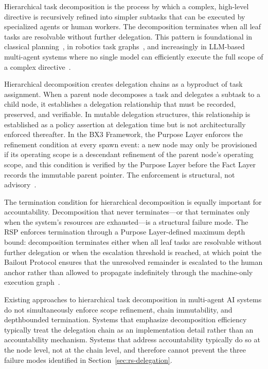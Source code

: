 Hierarchical task decomposition is the process by which a complex, high-level directive is recursively refined into simpler subtasks that can be executed by specialized agents or human workers. The decomposition terminates when all leaf tasks are resolvable without further delegation. This pattern is foundational in classical planning~\cite{hybrid_llm_agents}, in robotics task graphs~\cite{robot_task_decomposition}, and increasingly in LLM-based multi-agent systems where no single model can efficiently execute the full scope of a complex directive~\cite{multi_agent_decomposition_survey}.

Hierarchical decomposition creates delegation chains as a byproduct of task assignment. When a parent node decomposes a task and delegates a subtask to a child node, it establishes a delegation relationship that must be recorded, preserved, and verifiable. In mutable delegation structures, this relationship is established as a policy assertion at delegation time but is not architecturally enforced thereafter. In the BX3 Framework, the Purpose Layer enforces the refinement condition at every spawn event: a new node may only be provisioned if its operating scope is a descendant refinement of the parent node's operating scope, and this condition is verified by the Purpose Layer before the Fact Layer records the immutable parent pointer. The enforcement is structural, not advisory~\cite{bx3_framework_2026}.

The termination condition for hierarchical decomposition is equally important for accountability. Decomposition that never terminates---or that terminates only when the system's resources are exhausted---is a structural failure mode. The RSP enforces termination through a Purpose Layer-defined maximum depth bound: decomposition terminates either when all leaf tasks are resolvable without further delegation or when the escalation threshold is reached, at which point the Bailout Protocol ensures that the unresolved remainder is escalated to the human anchor rather than allowed to propagate indefinitely through the machine-only execution graph~\cite{bailout_protocol_2026}.

Existing approaches to hierarchical task decomposition in multi-agent AI systems do not simultaneously enforce scope refinement, chain immutability, and depthbounded termination. Systems that emphasize decomposition efficiency~\cite{multi_agent_decomposition_survey} typically treat the delegation chain as an implementation detail rather than an accountability mechanism. Systems that address accountability typically do so at the node level, not at the chain level, and therefore cannot prevent the three failure modes identified in Section~\ref{sec:rs-delegation}.

